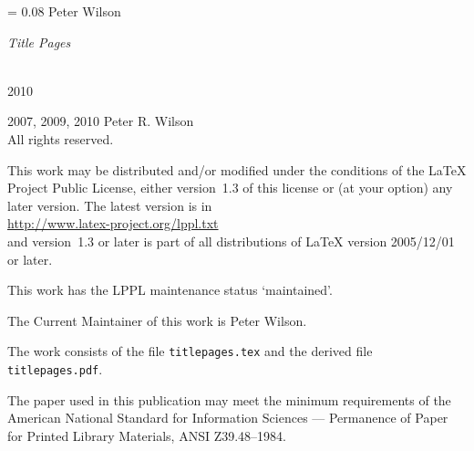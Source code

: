 \documentclass{memoir}
\newlength{\drop}
\newcommand*{\thistitle}{\begingroup%
\parindent=0pt
\drop = 0.08\textheight
\vspace*{\drop}
\hspace*{0.3\textwidth}%
{\LARGE Peter Wilson}\\[2\drop]
\hspace*{0.3\textwidth}{\HUGE\itshape Some Examples of}\par
{\raggedleft\HUGE\itshape Title Pages\par}
\vfill
\settowidth{\bibindent}{\Large The Herries Press}%
\settowidth{\unitlength}{\Large 2006}%
\addtolength{\bibindent}{-\unitlength}%
\hspace*{0.3\textwidth}{\Large The Herries Press}\\[0.5\baselineskip]
\hspace*{0.3\textwidth}%
{\Large 2010}
\vspace*{\drop}
\endgroup}
\begin{document}
\raggedbottom

\frontmatter
\pagestyle{empty}
\thistitle
\clearpage

\begingroup
\footnotesize
\parindent 0pt
\parskip \baselineskip
\textcopyright{} 2007, 2009, 2010 Peter R. Wilson \\
All rights reserved.

    This work may be distributed and/or modified under the conditions
of the LaTeX Project Public License, either version~1.3 of this license
or (at your option) any later version. The latest version is in \\
\hspace*{2em} \url{http://www.latex-project.org/lppl.txt} \\
and version~1.3 or later is part of all distributions of LaTeX
version 2005/12/01 or later.

    This work has the LPPL maintenance status `maintained'.

    The Current Maintainer of this work is Peter Wilson.

    The work consists of the file \texttt{titlepages.tex} and the
derived file \texttt{titlepages.pdf}.

\begin{comment}
This material may be distributed only subject to the terms and conditions
set forth in the Open Publication License v1.0 or later (the latest
version is presently available at \url{http://www.opencontent.org/openpub/}).
Distribution of substantively modified versions of this document is
prohibited without the explicit permission of the copyright holder.
Distribution of the work or derivative of the work in any standard
(paper) book form is prohibited unless prior permission is obtained
from the copyright holder.


The procedures and applications presented in this work have been
included for their instructional value. They have been tested 
with care but are not guaranteed for any particular purpose.
The publisher does not offer any warranties or representations,
nor does it accept any liabilities with respect to the 
programs or applications.
\end{comment}

The paper used in this publication may meet the minimum 
requirements of the American National Standard for 
Information Sciences --- Permanence of Paper for Printed
Library Materials, ANSI Z39.48--1984.
\end{document}
